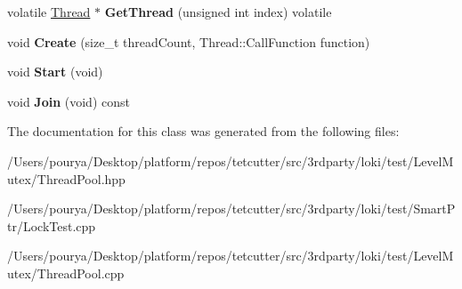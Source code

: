 \begin{DoxyCompactItemize}
\item 
\hypertarget{classThreadPool_a4b0bb4b5ea43aa86cc40ca397a06283a}{}volatile \hyperlink{structThread}{Thread} $\ast$ {\bfseries Get\+Thread} (unsigned int index) volatile\label{classThreadPool_a4b0bb4b5ea43aa86cc40ca397a06283a}

\item 
\hypertarget{classThreadPool_a916dae4654cd1c2b29f1cef4f6363301}{}void {\bfseries Create} (size\+\_\+t thread\+Count, Thread\+::\+Call\+Function function)\label{classThreadPool_a916dae4654cd1c2b29f1cef4f6363301}

\item 
\hypertarget{classThreadPool_a0ab9f52d202167102af0d22c68a160ed}{}void {\bfseries Start} (void)\label{classThreadPool_a0ab9f52d202167102af0d22c68a160ed}

\item 
\hypertarget{classThreadPool_a313df90bc916146ec9274a812f1b0f05}{}void {\bfseries Join} (void) const \label{classThreadPool_a313df90bc916146ec9274a812f1b0f05}

\end{DoxyCompactItemize}


The documentation for this class was generated from the following files\+:\begin{DoxyCompactItemize}
\item 
/\+Users/pourya/\+Desktop/platform/repos/tetcutter/src/3rdparty/loki/test/\+Level\+Mutex/Thread\+Pool.\+hpp\item 
/\+Users/pourya/\+Desktop/platform/repos/tetcutter/src/3rdparty/loki/test/\+Smart\+Ptr/Lock\+Test.\+cpp\item 
/\+Users/pourya/\+Desktop/platform/repos/tetcutter/src/3rdparty/loki/test/\+Level\+Mutex/Thread\+Pool.\+cpp\end{DoxyCompactItemize}
